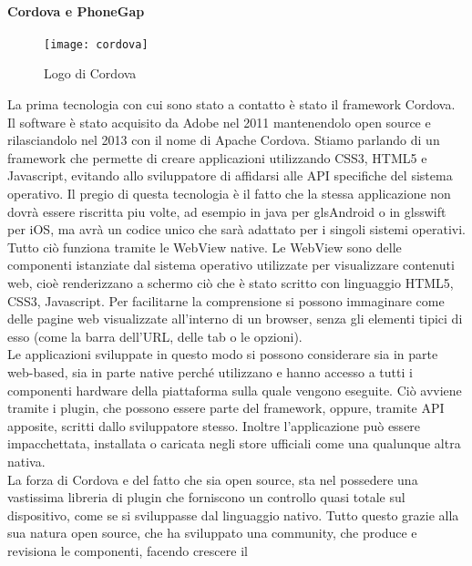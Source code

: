 \paragraph{Cordova e PhoneGap}

\begin{figure}[h]
	\begin{center}
		\texttt{[image: cordova]}
		\caption{Logo di Cordova}
	\end{center}
\end{figure}

La prima tecnologia con cui sono stato a contatto è stato il framework Cordova. Il software è stato acquisito da Adobe nel
2011 mantenendolo \gls{open source} e rilasciandolo nel 2013 con il nome di Apache Cordova. Stiamo parlando di un framework
che permette di creare applicazioni utilizzando CSS3, HTML5 e Javascript, evitando allo sviluppatore di affidarsi alle API
specifiche del sistema operativo. Il pregio di questa tecnologia è il fatto che la stessa applicazione non dovrà essere
riscritta piu volte, ad esempio in \gls{java} per gls{Android} o in gls{swift} per \gls{iOS}, ma avrà un codice unico che
sarà adattato per i singoli sistemi operativi. \\
Tutto ciò funziona tramite le WebView native. Le WebView sono delle componenti istanziate dal sistema operativo
utilizzate per visualizzare contenuti web, cioè renderizzano a schermo ciò che è stato scritto con linguaggio HTML5,
CSS3, Javascript. Per facilitarne la comprensione si possono immaginare come delle pagine web visualizzate all'interno
di un browser, senza gli elementi tipici di esso (come la barra dell'URL, delle tab o le opzioni). \\
Le applicazioni sviluppate in questo modo si possono considerare sia in parte \gls{web-based}, sia in parte native
perché utilizzano e hanno accesso a tutti i componenti hardware della piattaforma sulla quale vengono eseguite. Ciò
avviene tramite i plugin, che possono essere parte del framework, oppure, tramite API apposite, scritti dallo
sviluppatore stesso. Inoltre l'applicazione può essere impacchettata, installata o caricata negli store ufficiali come
una qualunque altra nativa. \\
La forza di Cordova e del fatto che sia open source, sta nel possedere una vastissima libreria di plugin che forniscono
un controllo quasi totale sul dispositivo, come se si sviluppasse dal linguaggio nativo. Tutto questo grazie alla sua
natura \gls{open source}, che ha sviluppato una community, che produce e revisiona le componenti, facendo crescere il
